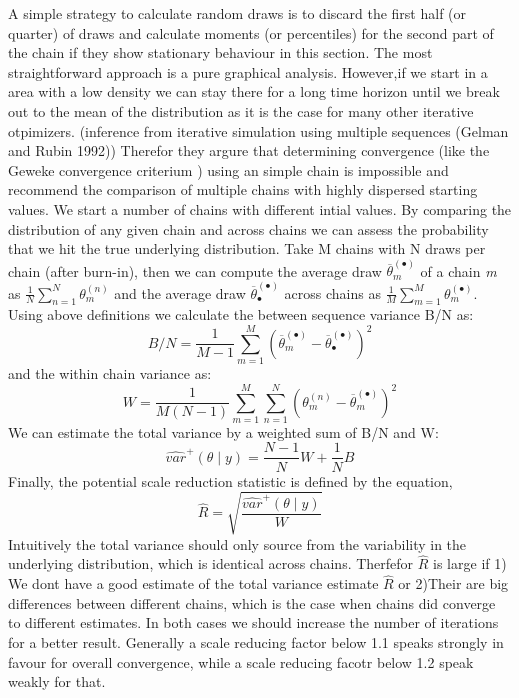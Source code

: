 A simple strategy to calculate random draws is to  discard the first half (or quarter) of draws and calculate moments (or percentiles) for the second part of the chain if they show stationary behaviour in this section.
The most straightforward approach is a pure graphical analysis.
However,if we start in a area with a low density we can stay there for a long time horizon until we break out to the mean of the distribution as it is the case for many other iterative otpimizers. (inference from iterative simulation using multiple sequences (Gelman and Rubin 1992)) \cite{gelman1992}
Therefor they argure that determining convergence (like the Geweke convergence criterium  \cite{geweke1992}) using an simple chain is impossible\cite{brooks1998} and recommend the comparison of multiple chains with highly dispersed starting values. 
We start a number of chains with different intial values. By comparing the distribution of any given chain and across chains we can assess the probability that we hit the true underlying distribution.
Take M chains with N draws per chain (after burn-in), then we can compute the average draw $\overline{\theta}_m^{(\bullet)}$ of a chain \emph{m} as $\frac{1}{N} \sum_{n=1}^{N} \theta_m^{(n)}$ 
and the average draw $\overline{\theta}_{\bullet}^{(\bullet)}$ across chains as $\frac{1}{M} \sum_{m=1}^{M} \theta_m^{(\bullet)}$.
Using above definitions we calculate the between sequence variance B/N as:
$$B/N=\frac{1}{M-1} \sum_{m=1}^{M} (\overline{\theta}_m^{(\bullet)}-\overline{\theta}_{\bullet}^{(\bullet)} )^2 $$
and the within chain variance as:
$$W=\frac{1}{M(N-1)} \sum_{m=1}^{M} \sum_{n=1}^{N} (\theta_m^{(n)}-\overline{\theta}_{m}^{(\bullet)} )^2$$
We can estimate the total variance by a weighted sum of B/N and W: $$\widehat{var}^+ (\theta \mid y)=\frac{N-1}{N}W+\frac{1}{N}B$$
Finally, the potential scale reduction statistic is defined by the equation,
$$\widehat{R}=\sqrt{\frac{\widehat{var}^+ (\theta \mid y)}{W}}$$
Intuitively the total variance should only source from the variability in the underlying distribution, which is identical across chains. Therfefor $ \widehat{R}$ is large if 1) We dont have a good estimate of the total variance estimate $\widehat{R}$ or 
2)Their are big differences between different chains, which is the case when chains did converge to different estimates. In both cases we should increase the number of iterations for a better result. Generally a scale reducing factor below 1.1 speaks strongly in favour for overall convergence, while a scale reducing facotr below 1.2 speak weakly for that.

